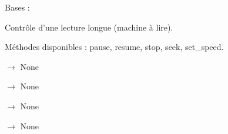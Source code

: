 \documentclass[letterpaper,10pt,french]{sphinxmanual}
\begin{document}
\begin{fulllineitems}
\label{\detokenize{api/core:core.speaker.PlaybackHandle}}
\pysigstartsignatures
\pysiglinewithargsret
{}
{}
{}
\pysigstopsignatures
\sphinxAtStartPar
Bases : 

\sphinxAtStartPar
Contrôle d’une lecture longue (machine à lire).

\sphinxAtStartPar
Méthodes disponibles : pause, resume, stop, seek, set\_speed.

\begin{fulllineitems}
\label{\detokenize{api/core:core.speaker.PlaybackHandle.pause}}
\pysigstartsignatures
\pysiglinewithargsret
{}
{}
{{ $\rightarrow$ None}}
\pysigstopsignatures
\end{fulllineitems}


\begin{fulllineitems}
\label{\detokenize{api/core:core.speaker.PlaybackHandle.resume}}
\pysigstartsignatures
\pysiglinewithargsret
{}
{}
{{ $\rightarrow$ None}}
\pysigstopsignatures
\end{fulllineitems}


\begin{fulllineitems}
\label{\detokenize{api/core:core.speaker.PlaybackHandle.stop}}
\pysigstartsignatures
\pysiglinewithargsret
{}
{}
{{ $\rightarrow$ None}}
\pysigstopsignatures
\end{fulllineitems}


\begin{fulllineitems}
\label{\detokenize{api/core:core.speaker.PlaybackHandle.seek}}
\pysigstartsignatures
\pysiglinewithargsret
{}
{}
{{ $\rightarrow$ None}}
\pysigstopsignatures
\end{fulllineitems}


\end{fulllineitems}
\end{document}
